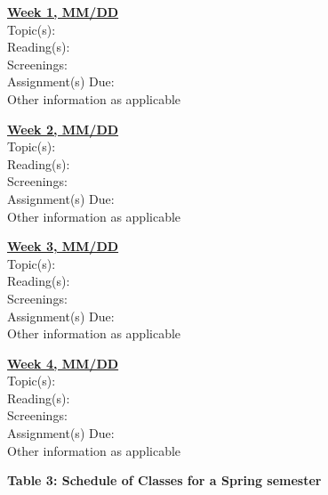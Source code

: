 \documentclass[12pt]{article} %
\begin{document}
\noindent \textbf{\underline{Week 1, MM/DD}}
\vspace{0.3em} \\
Topic(s): \\
Reading(s): \\
Screenings: \\
Assignment(s) Due: \\
Other information as applicable

\vspace{0.5em}

\noindent \textbf{\underline{Week 2, MM/DD}}
\vspace{0.3em} \\
Topic(s): \\
Reading(s): \\
Screenings: \\
Assignment(s) Due: \\
Other information as applicable

\vspace{0.5em}

\noindent \textbf{\underline{Week 3, MM/DD}}
\vspace{0.3em} \\
Topic(s): \\
Reading(s): \\
Screenings: \\
Assignment(s) Due: \\
Other information as applicable

\vspace{0.5em}

\noindent \textbf{\underline{Week 4, MM/DD}}
\vspace{0.3em} \\
Topic(s): \\
Reading(s): \\
Screenings: \\
Assignment(s) Due: \\
Other information as applicable

\vspace{0.5em}


\vspace{0.5em}


\begin{center}
\textbf{Table 3: Schedule of Classes for a Spring semester}
\end{center}
\end{document}
